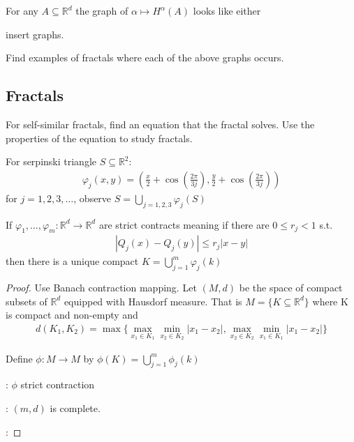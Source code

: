 For any $A \subseteq \mathbb{R}^d$ the graph of $\alpha \mapsto H^{\alpha} (A)$ looks like either 

insert graphs.

\begin{exercise}
	Find examples of fractals where each of the above graphs occurs.
\end{exercise}

\subsection{Fractals}

For self-similar fractals, find an equation that the fractal solves. Use the properties of the equation to study fractals.

\begin{example}
	For serpinski triangle $S \subseteq \mathbb{R}^2$:
	\begin{align*}
		\varphi_{j} (x, y) = (\frac{x}{2} + \cos(\frac{2 \pi}{3 j}), \frac{y}{2} + \cos(\frac{2 \pi}{3 j}) )
	\end{align*} for $j = 1,2,3, \ldots$, observe
	$S = \bigcup_{j = 1,2,3} \varphi_j (S) $
\end{example}

\begin{theorem}
	If $\varphi_{1}, \ldots, \varphi_{m} : \mathbb{R}^d \to \mathbb{R}^d$ are strict contracts meaning if there are $0 \leq r_{j} < 1$ s.t.
	\begin{align*}
		| Q_j (x) - Q_j (y) | \leq r_{j} |x - y |
	\end{align*} then there is a unique compact
	$K = \bigcup_{j=1}^{m} \varphi_{j} (k)$
\end{theorem}

\begin{proof}
	Use Banach contraction mapping. Let $(M,d)$ be the space of compact subsets of $\mathbb{R}^d$ equipped with Hausdorf measure.
	That is $M = \{K \subseteq \mathbb{R}^d\}$ where K is compact and non-empty
	and
	\begin{align*}
		d(K_1, K_2) = \max\{ \max_{x_1 \in K_1} \min_{x_2 \in K_2} |x_1 - x_2|, \max_{x_2 \in K_2} \min_{x_1 \in K_1} |x_1 - x_2| \}
	\end{align*}

	Define $\phi : M \to M$ by  $\phi (K) = \bigcup_{j=1}^{m} \phi_j (k)$
	\item[claim 1]: $\phi$ strict contraction
	\item[claim 2]: $(m,d)$ is complete.

	\item[Proof of claim 1]:
\end{proof}

